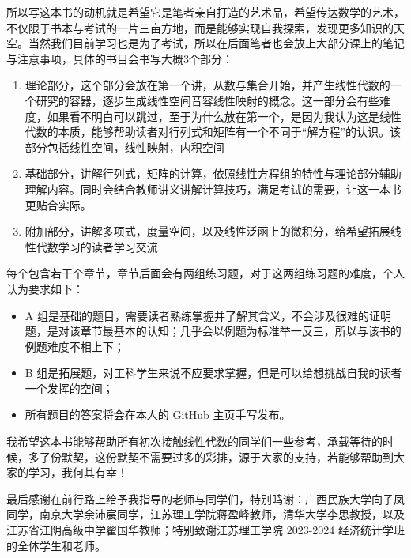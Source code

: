 所以写这本书的动机就是希望它是笔者亲自打造的艺术品，希望传达数学的艺术，不仅限于书本与考试的一片三亩方地，而是能够实现自我探索，发现更多知识的天空。当然我们目前学习也是为了考试，所以在后面笔者也会放上大部分课上的笔记与注意事项，具体的书目会书写大概3个部分：

\vspace{1em}

\begin{enumerate}
	\item 理论部分，这个部分会放在第一个讲，从数与集合开始，并产生线性代数的一个研究的容器，逐步生成线性空间音容线性映射的概念。这一部分会有些难度，如果看不明白可以跳过，至于为什么放在第一个，是因为我认为这是线性代数的本质，能够帮助读者对行列式和矩阵有一个不同于``解方程''的认识。该部分包括线性空间，线性映射，内积空间
	\item 基础部分，讲解行列式，矩阵的计算，依照线性方程组的特性与理论部分辅助理解内容。同时会结合教师讲义讲解计算技巧，满足考试的需要，让这一本书更贴合实际。
	\item 附加部分，讲解多项式，度量空间，以及线性泛函上的微积分，给希望拓展线性代数学习的读者学习交流
\end{enumerate}

\vspace{1em}

每个包含若干个章节，章节后面会有两组练习题，对于这两组练习题的难度，个人认为要求如下：

\vspace{1em}

\begin{itemize}
	\item A 组是基础的题目，需要读者熟练掌握并了解其含义，不会涉及很难的证明题，是对该章节最基本的认知；几乎会以例题为标准举一反三，所以与该书的例题难度不相上下；
	\item B 组是拓展题，对工科学生来说不应要求掌握，但是可以给想挑战自我的读者一个发挥的空间；
	\item 所有题目的答案将会在本人的 GitHub 主页手写发布。
\end{itemize}

\vspace{1em}

我希望这本书能够帮助所有初次接触线性代数的同学们一些参考，承载等待的时候，多了份默契，这份默契不需要过多的彩排，源于大家的支持，若能够帮助到大家的学习，我何其有幸！

最后感谢在前行路上给予我指导的老师与同学们，特别鸣谢：广西民族大学向子凤同学，南京大学余沛宸同学，江苏理工学院蒋盈峰教师，清华大学李思教授，以及江苏省江阴高级中学翟国华教师；特别致谢江苏理工学院 2023-2024 经济统计学班的全体学生和老师。 


